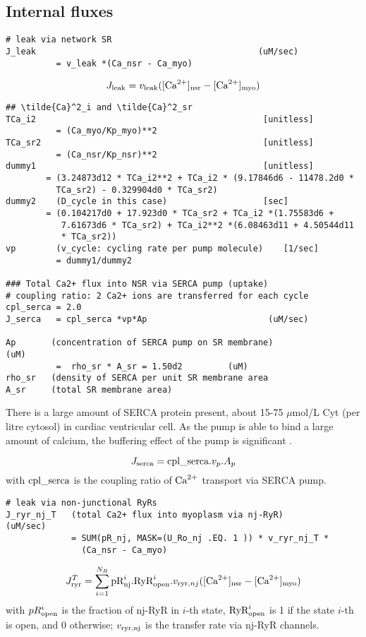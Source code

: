 \subsection{Internal fluxes}
\label{sec:internal-fluxes}


\begin{verbatim}
# leak via network SR
J_leak                                            (uM/sec)
          = v_leak *(Ca_nsr - Ca_myo)
\end{verbatim}
\begin{equation}
  \label{eq:14}
  J_{\text{leak}} = v_{\text{leak}} ([{\text{Ca}^{2+}}]_{\text{nsr}} - [{\text{Ca}^{2+}}]_{\text{myo}})
\end{equation}


\begin{verbatim}
## \tilde{Ca}^2_i and \tilde{Ca}^2_sr 
TCa_i2                                             [unitless]
          = (Ca_myo/Kp_myo)**2
TCa_sr2                                            [unitless]
          = (Ca_nsr/Kp_nsr)**2
dummy1                                             [unitless]
        = (3.24873d12 * TCa_i2**2 + TCa_i2 * (9.17846d6 - 11478.2d0 *
          TCa_sr2) - 0.329904d0 * TCa_sr2)
dummy2    (D_cycle in this case)                   [sec]
        = (0.104217d0 + 17.923d0 * TCa_sr2 + TCa_i2 *(1.75583d6 +
           7.61673d6 * TCa_sr2) + TCa_i2**2 *(6.08463d11 + 4.50544d11
           * TCa_sr2))  
vp        (v_cycle: cycling rate per pump molecule)    [1/sec]
          = dummy1/dummy2

### Total Ca2+ flux into NSR via SERCA pump (uptake)
# coupling ratio: 2 Ca2+ ions are transferred for each cycle
cpl_serca = 2.0
J_serca   = cpl_serca *vp*Ap                        (uM/sec)

Ap       (concentration of SERCA pump on SR membrane)              (uM)
          =  rho_sr * A_sr = 1.50d2         (uM)
rho_sr   (density of SERCA per unit SR membrane area
A_sr     (total SR membrane area)
\end{verbatim}
There is a large amount of SERCA protein present\citep{bers2001ecc}, about 15-75
$\mu$mol/L Cyt (per litre cytosol) in cardiac ventricular cell. As the
pump is able to bind a large amount of calcium, the buffering effect
of the pump is significant \citep{higgins2006}.

\begin{equation}
  \label{eq:17}
  J_{\text{serca}} = {\text{cpl}}\_\text{serca}.v_p.A_p
\end{equation}
with ${\text{cpl}}\_\text{serca}$ is the coupling ratio of ${\text{Ca}^{2+}}$ transport via SERCA pump.

\begin{verbatim}
# leak via non-junctional RyRs
J_ryr_nj_T   (total Ca2+ flux into myoplasm via nj-RyR)            (uM/sec)
             = SUM(pR_nj, MASK=(U_Ro_nj .EQ. 1 )) * v_ryr_nj_T *
               (Ca_nsr - Ca_myo) 
\end{verbatim}
\begin{equation}
  \label{eq:16}
  J_{\text{ryr}}^T = \sum^{N_R}_{i=1} {\text{pR}}^i_{\text{nj}} .{\text{RyR}}^i_{\text{open}} .v_{\text{ryr},nj} ([{\text{Ca}^{2+}}]_{\text{nsr}}-[{\text{Ca}^{2+}}]_{\text{myo}})
\end{equation}
with $pR^i_{\text{open}}$ is the fraction of nj-RyR in $i$-th state,
${\text{RyR}}^i_{\text{open}}$ is 1 if the state $i$-th is open, and 0 otherwise;
$v_{\text{ryr},{\text{nj}}}$ is the transfer rate via nj-RyR channels. 

